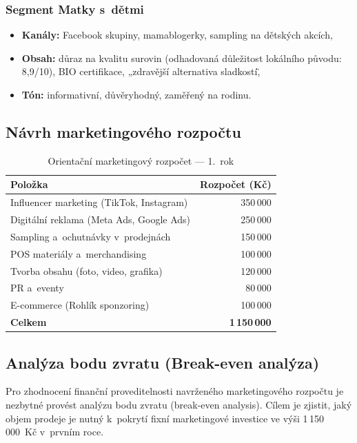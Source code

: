 \subsubsection{Segment Matky s~dětmi}

\begin{itemize}
  \item \textbf{Kanály:} Facebook skupiny, mamablogerky, sampling na dětských akcích,
  \item \textbf{Obsah:} důraz na kvalitu surovin (odhadovaná důležitost lokálního původu: 8,9/10), BIO certifikace, „zdravější alternativa sladkostí\",
  \item \textbf{Tón:} informativní, důvěryhodný, zaměřený na rodinu.
\end{itemize}

\subsection{Návrh marketingového rozpočtu}

\begin{table}[H]
\centering
\caption{Orientační marketingový rozpočet — 1.\ rok}
\label{tab:budget}
\begin{tabular}{lr}
\toprule
\textbf{Položka} & \textbf{Rozpočet (Kč)} \\
\midrule
Influencer marketing (TikTok, Instagram) & 350\,000 \\
Digitální reklama (Meta Ads, Google Ads) & 250\,000 \\
Sampling a~ochutnávky v~prodejnách & 150\,000 \\
POS materiály a~merchandising & 100\,000 \\
Tvorba obsahu (foto, video, grafika) & 120\,000 \\
PR a~eventy & 80\,000 \\
E-commerce (Rohlík sponzoring) & 100\,000 \\
\midrule
\textbf{Celkem} & \textbf{1\,150\,000} \\
\bottomrule
\end{tabular}
\end{table}

\subsection{Analýza bodu zvratu (Break-even analýza)}

Pro zhodnocení finanční proveditelnosti navrženého marketingového rozpočtu je nezbytné provést analýzu bodu zvratu (break-even analysis). Cílem je zjistit, jaký objem prodeje je nutný k~pokrytí fixní marketingové investice ve výši 1\,150\,000~Kč v~prvním roce.


